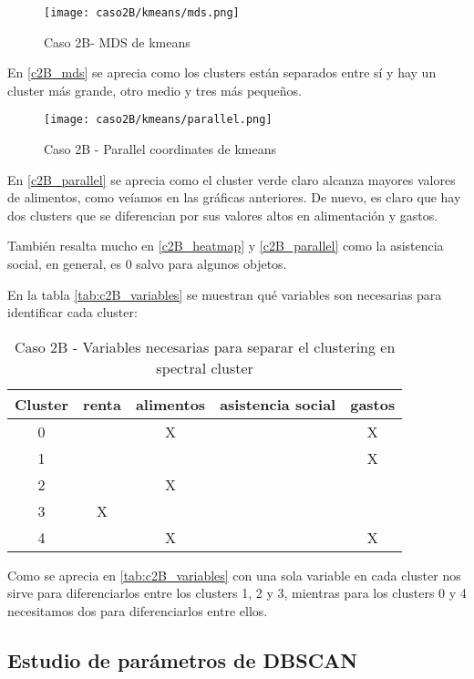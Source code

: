 \begin{figure}[H]
\caption{Caso 2B- MDS de kmeans}
\label{c2B_mds}
\texttt{[image: caso2B/kmeans/mds.png]}
\end{figure}

En \eqref{c2B_mds} se aprecia como los clusters están separados entre sí y hay un cluster más grande, otro medio y tres más pequeños.

\begin{figure}[H]
\caption{Caso 2B - Parallel coordinates de kmeans}
\label{c2B_parallel}
\texttt{[image: caso2B/kmeans/parallel.png]}
\end{figure}

En \eqref{c2B_parallel} se aprecia como el cluster verde claro  alcanza mayores valores de alimentos, como veíamos en las gráficas anteriores. De nuevo, es claro que hay dos clusters que se diferencian por sus valores altos en alimentación y gastos.

También resalta mucho en \eqref{c2B_heatmap} y \eqref{c2B_parallel} como la asistencia social, en general, es 0 salvo para algunos objetos.

En la tabla  \eqref{tab:c2B_variables} se muestran qué variables son necesarias para identificar cada cluster:

\begin{table}[H]
\centering
\caption{Caso 2B - Variables necesarias para separar el clustering en spectral cluster}
\label{tab:c2B_variables}
\begin{tabular}{ccccc}
\toprule
 Cluster & renta & alimentos & asistencia social & gastos \\
\midrule
0 & & X & & X \\
1 & & & & X \\
2 & & X & & \\
3 & X & & & \\
4 & & X & & X \\
\bottomrule
\end{tabular}
\end{table}
Como se aprecia en \eqref{tab:c2B_variables} con una sola variable en cada cluster nos sirve para diferenciarlos entre los clusters 1, 2 y 3, mientras para los clusters 0 y 4 necesitamos dos para diferenciarlos entre ellos.

\subsection{Estudio de parámetros de DBSCAN}

